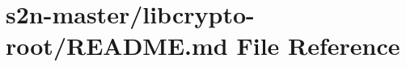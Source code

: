 \hypertarget{libcrypto-root_2_r_e_a_d_m_e_8md}{}\section{s2n-\/master/libcrypto-\/root/\+R\+E\+A\+D\+ME.md File Reference}
\label{libcrypto-root_2_r_e_a_d_m_e_8md}
